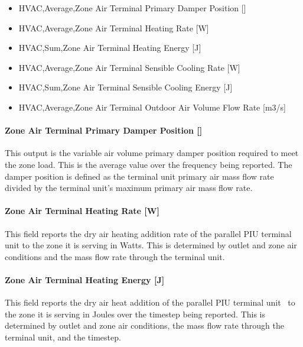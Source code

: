 \begin{itemize}
\item
  HVAC,Average,Zone Air Terminal Primary Damper Position {[]}
\item
  HVAC,Average,Zone Air Terminal Heating Rate {[}W{]}
\item
  HVAC,Sum,Zone Air Terminal Heating Energy {[}J{]}
\item
  HVAC,Average,Zone Air Terminal Sensible Cooling Rate {[}W{]}
\item
  HVAC,Sum,Zone Air Terminal Sensible Cooling Energy {[}J{]}
\item
  HVAC,Average,Zone Air Terminal Outdoor Air Volume Flow Rate {[}m3/s{]}
\end{itemize}

\paragraph{Zone Air Terminal Primary Damper Position {[]}}\label{zone-air-terminal-parallel-piu-primary-damper-position}

This output is the variable air volume primary damper position required to meet the zone load. This is the average value over the frequency being reported. The damper position is defined as the terminal unit primary air mass flow rate divided by the terminal unit's maximum primary air mass flow rate.

\paragraph{Zone Air Terminal Heating Rate {[}W{]}}\label{zone-air-terminal-heating-rate-w-1}

This field reports the dry air heating addition rate of the parallel PIU terminal unit to the zone it is serving in Watts. This is determined by outlet and zone air conditions and the mass flow rate through the terminal unit.

\paragraph{Zone Air Terminal Heating Energy {[}J{]}}\label{zone-air-terminal-heating-energy-j-1}

This field reports the dry air heat addition of the parallel PIU terminal unit~ to the zone it is serving in Joules over the timestep being reported. This is determined by outlet and zone air conditions, the mass flow rate through the terminal unit, and the timestep.

